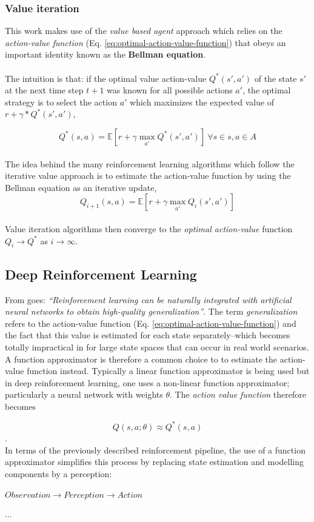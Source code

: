 \subsubsection{Value iteration}

This work makes use of the \textit{value based agent} approach which relies on the \textit{action-value function} (Eq. \ref{eq:optimal-action-value-function}) that obeys an important identity known as the \textbf{Bellman equation}. 
\\
\\
The intuition is that: if the optimal value action-value $Q^*(s',a')$ of the state $s'$ at the next time step $t+1$ was known for all possible actions $a'$, the optimal strategy is to select the action $a'$ which maximizes the expected value of $r+\gamma*Q^*(s',a')$,

\begin{equation}\label{eq:bellman}
Q^*(s,a)=\mathbb{E}[r+\gamma \max_{a'} Q^*(s',a')] \ \forall{s}\in{s},  a\in{A}
\end{equation}
\\
The idea behind the many reinforcement learning algorithms which follow the iterative value approach is to estimate the action-value function by using the Bellman equation as an iterative update,
\begin{equation}
Q_{i+1}(s,a)=\mathbb{E}[r+\gamma \max_{a'}Q_{i}(s',a')]
\end{equation}
\\
Value iteration algorithms then converge to the \textit{optimal action-value} function $Q_{i} \rightarrow Q^*$ as $i \rightarrow \infty$. \cite{sutton1998reinforcement}

\subsection{Deep Reinforcement Learning}

From \cite{deeprlcourse} goes: \textit{``Reinforcement learning can be naturally integrated with artificial neural networks to obtain high-quality generalization''}.
The term \textit{generalization} refers to the action-value function (Eq. \ref{eq:optimal-action-value-function}) and the fact that this value is estimated for each state separately--which becomes totally impractical in for large state spaces that can occur in real world scenarios.
A function approximator is therefore a common choice to to estimate the action-value function instead. Typically a linear function approximator is being used but in deep reinforcement learning, one uses a non-linear function approximator; particularly a neural network with weights $\theta$. The \textit{action value function} therefore becomes

\begin{equation}
Q(s, a; \theta) \approx Q^*(s,a)
\end{equation}.
\\
In terms of the previously described reinforcement pipeline, the use of a function approximator simplifies this process by replacing state estimation and modelling components by a perception:
\\
\\
$Observation \rightarrow Perception \rightarrow Action$

...